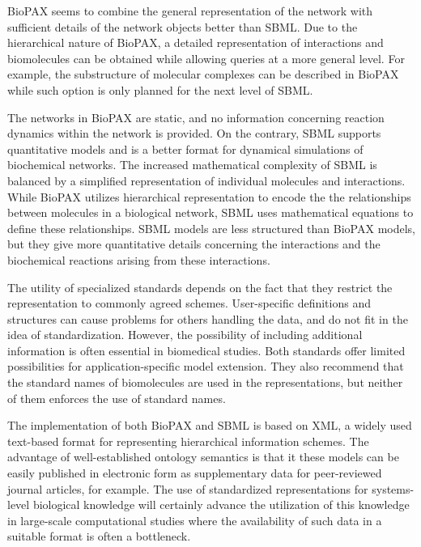 \documentclass[a4paper,10pt,titlepage]{article}
\begin{document}
BioPAX seems to combine the general representation of the network with sufficient details of the network objects better than SBML. Due to the hierarchical nature of BioPAX, a detailed representation of interactions and biomolecules can be obtained while allowing queries at a more general level. For example, the substructure of molecular complexes can be described in BioPAX while such option is only planned for the next level of SBML. 

The networks in BioPAX are static, and no information concerning reaction dynamics within the network is provided. On the contrary, SBML supports quantitative models and is a better format for dynamical simulations of biochemical networks. The increased mathematical complexity of SBML is balanced by a simplified representation of individual molecules and interactions. While BioPAX utilizes hierarchical representation to encode the the relationships between molecules in a biological network, SBML uses mathematical equations to define these relationships. SBML models are less structured than BioPAX models, but they give more quantitative details concerning the interactions and the biochemical reactions arising from these interactions. 

The utility of specialized standards depends on the fact that they restrict the representation to commonly agreed schemes. User-specific definitions and structures can cause problems for others handling the data, and do not fit in the idea of standardization. However, the possibility of including additional information is often essential in biomedical studies. Both standards offer limited possibilities for application-specific model extension. They also recommend that the standard names of biomolecules are used in the representations, but neither of them enforces the use of standard names.

The implementation of both BioPAX and SBML is based on XML, a widely used text-based format for representing hierarchical information schemes. The advantage of well-established ontology semantics is that it these models can be easily published in electronic form as supplementary data for peer-reviewed journal articles, for example. The use of standardized representations for systems-level biological knowledge will certainly advance the utilization of this knowledge in large-scale computational studies where the availability of such data in a suitable format is often a bottleneck. 
\end{document}
